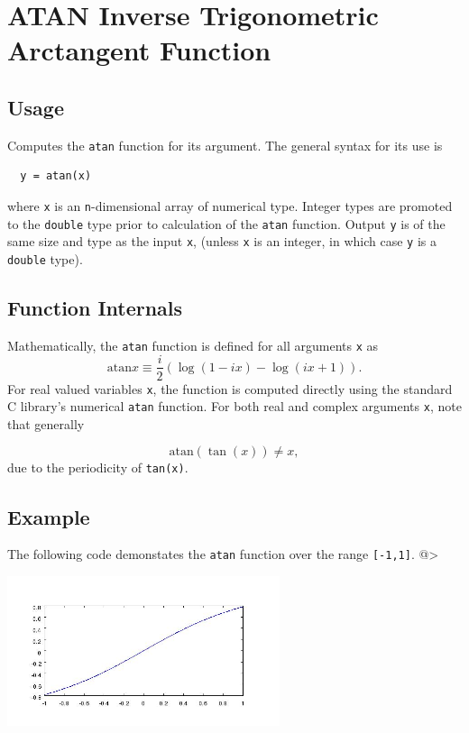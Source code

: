 \section{ATAN Inverse Trigonometric Arctangent Function}

\subsection{Usage}

Computes the \verb|atan| function for its argument.  The general
syntax for its use is
\begin{verbatim}
  y = atan(x)
\end{verbatim}
where \verb|x| is an \verb|n|-dimensional array of numerical type.
Integer types are promoted to the \verb|double| type prior to
calculation of the \verb|atan| function.  Output \verb|y| is of the
same size and type as the input \verb|x|, (unless \verb|x| is an
integer, in which case \verb|y| is a \verb|double| type).  
\subsection{Function Internals}

Mathematically, the \verb|atan| function is defined for all 
arguments \verb|x| as
\[
   \mathrm{atan} x \equiv \frac{i}{2}\left(\log(1-i x) - \log(i x + 1)\right).
\]
For real valued variables \verb|x|, the function is computed directly using 
the standard C library's numerical \verb|atan| function. For both 
real and complex arguments \verb|x|, note that generally

\[
    \mathrm{atan}(\tan(x)) \neq x,
\]
 due to the periodicity of \verb|tan(x)|.
\subsection{Example}

The following code demonstates the \verb|atan| function over the range 
\verb|[-1,1]|.
@>


\centerline{\includegraphics[width=8cm]{atanplot}}

